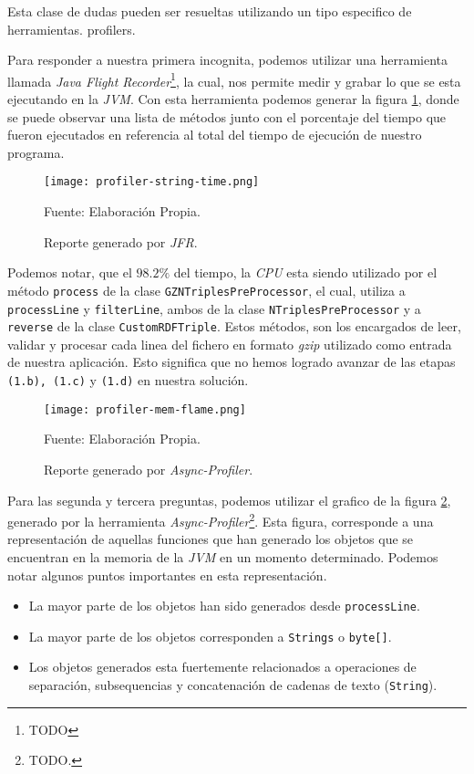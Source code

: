 Esta clase de dudas pueden ser resueltas utilizando un tipo especifico de herramientas. profilers.

Para responder a nuestra primera incognita, podemos utilizar una herramienta llamada \textit{Java Flight Recorder}\footnote{TODO}, la cual, nos permite medir y grabar lo que se esta ejecutando en la \textit{JVM}. Con esta herramienta podemos generar la figura \ref{fig:i2-prof-jfr}, donde se puede observar una lista de métodos junto con el porcentaje del tiempo que fueron ejecutados en referencia al total del tiempo de ejecución de nuestro programa.

\begin{figure}[ht]
    \centering
    \texttt{[image: profiler-string-time.png]}
    \caption{Reporte generado por \textit{JFR}.}Fuente: Elaboración Propia.
    \label{fig:i2-prof-jfr}
\end{figure}

Podemos notar, que el $98.2\%$ del tiempo, la \textit{CPU} esta siendo utilizado por el método \texttt{process} de la clase \texttt{GZNTriplesPreProcessor}, el cual, utiliza a \texttt{processLine} y \texttt{filterLine}, ambos de la clase \texttt{NTriplesPreProcessor} y a \texttt{reverse} de la clase \texttt{CustomRDFTriple}. Estos métodos, son los encargados de leer, validar y procesar cada linea del fichero en formato \textit{gzip} utilizado como entrada de nuestra aplicación. Esto significa que no hemos logrado avanzar de las etapas \texttt{(1.b), (1.c)} y \texttt{(1.d)} en nuestra solución.

\begin{figure}[ht]
    \centering
    \texttt{[image: profiler-mem-flame.png]}
    \caption{Reporte generado por \textit{Async-Profiler}.}Fuente: Elaboración Propia.
    \label{fig:i2-prof-mem}
\end{figure}

Para las segunda y tercera preguntas, podemos utilizar el grafico de la figura \ref{fig:i2-prof-mem}, generado por la herramienta \textit{Async-Profiler}\footnote{TODO.}. Esta figura, corresponde a una representación de aquellas funciones que han generado los objetos que se encuentran en la memoria de la \textit{JVM} en un momento determinado. Podemos notar algunos puntos importantes en esta representación.

\begin{itemize}
    \item La mayor parte de los objetos han sido generados desde \texttt{processLine}.
    \item La mayor parte de los objetos corresponden a \texttt{Strings} o \texttt{byte[]}.
    \item Los objetos generados esta fuertemente relacionados a operaciones de separación, subsequencias y concatenación de cadenas de texto (\texttt{String}).
\end{itemize}

